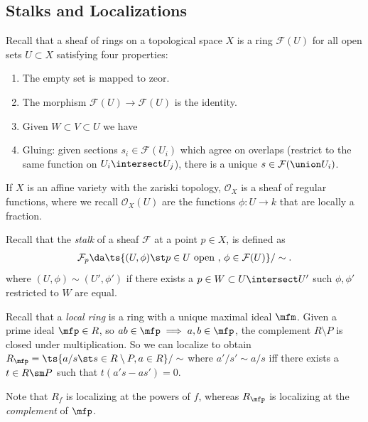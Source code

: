 \hypertarget{stalks-and-localizations}{%
\subsection{Stalks and Localizations}\label{stalks-and-localizations}}

Recall that a sheaf of rings on a topological space \(X\) is a ring
\(\mathcal{F}(U)\) for all open sets \(U\subset X\) satisfying four
properties:

\begin{enumerate}
\def\labelenumi{\arabic{enumi}.}
\item
  The empty set is mapped to zeor.
\item
  The morphism \(\mathcal{F}(U)\to \mathcal{F}(U)\) is the identity.
\item
  Given \(W\subset V\subset U\) we have
\item
  Gluing: given sections \(s_i \in\mathcal{F}(U_i)\) which agree on
  overlaps (restrict to the same function on \(U_i\intersect U_j\)),
  there is a unique \(s\in \mathcal{F}(\union U_i)\).
\end{enumerate}

\begin{example}

If \(X\) is an affine variety with the zariski topology,
\(\mathcal{O}_X\) is a sheaf of regular functions, where we recall
\(\mathcal{O}_X(U)\) are the functions \(\phi: U\to k\) that are locally
a fraction.

\end{example}

Recall that the \emph{stalk} of a sheaf \(\mathcal{F}\) at a point
\(p\in X\), is defined as
\begin{align*}  
\mathcal{F}_p \da \ts{(U, \phi) \st p\in U \text{ open },\, \phi \in \mathcal{F}(U)}/\sim
.\end{align*} where \((U, \phi) \sim (U', \phi')\) if there exists a
\(p\in W \subset U\intersect U'\) such \(\phi, \phi'\) restricted to
\(W\) are equal.

Recall that a \emph{local ring} is a ring with a unique maximal ideal
\(\mfm\). Given a prime ideal \(\mfp \in R\), so
\(ab\in \mfp \implies a,b\in \mfp\), the complement \(R\setminus P\) is
closed under multiplication. So we can localize to obtain
\(R_\mfp = \ts{a/s \st s\in R\setminus P, a\in R}/\sim\) where
\(a'/s' \sim a/s\) iff there exists a \(t\in R\sm P\) such that
\(t(a's - as') = 0\).

\begin{warning}

Note that \(R_f\) is localizing at the powers of \(f\), whereas
\(R_\mfp\) is localizing at the \emph{complement} of \(\mfp\).

\end{warning}

